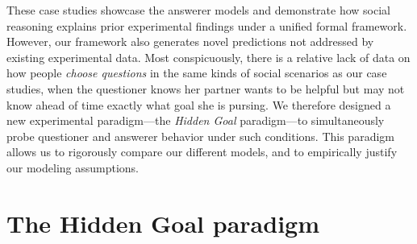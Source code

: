 \documentclass[12pt, floatsintext, jou]{apa6}
\begin{document}



These case studies showcase the answerer models and demonstrate how social reasoning explains prior experimental findings under a unified formal framework. 
However, our framework also generates novel predictions not addressed by existing experimental data.
Most conspicuously, there is a relative lack of data on how people \emph{choose questions} in the same kinds of social scenarios as our case studies, when the questioner knows her partner wants to be helpful but may not know ahead of time exactly what goal she is pursing.
We therefore designed a new experimental paradigm---the \emph{Hidden Goal} paradigm---to simultaneously probe questioner and answerer behavior under such conditions.
This paradigm allows us to rigorously compare our different models, and to empirically justify our modeling assumptions.

\section{The Hidden Goal paradigm}
\end{document}
